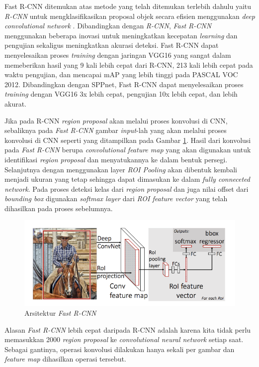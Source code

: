 Fast R-CNN ditemukan atas metode yang telah ditemukan terlebih dahulu yaitu \textit{R-CNN} untuk mengklasifikasikan proposal objek secara efisien menggunakan \textit{deep convolutional network} \citep{fast-rcnn}. Dibandingkan dengan \textit{R-CNN}, \textit{Fast R-CNN} menggunakan beberapa inovasi untuk meningkatkan kecepatan \textit{learning} dan pengujian sekaligus meningkatkan akurasi deteksi. Fast R-CNN dapat menyelesaikan proses \textit{training} dengan jaringan VGG16 yang sangat dalam memeberikan hasil yang 9 kali lebih cepat dari R-CNN, 213 kali lebih cepat pada waktu pengujian, dan mencapai mAP yang lebih tinggi pada PASCAL VOC 2012. Dibandingkan dengan SPPnet, Fast R-CNN dapat menyelesaikan proses \textit{training} dengan VGG16 3x lebih cepat, pengujian 10x lebih cepat, dan lebih akurat.

Jika pada R-CNN \textit{region proposal} akan melalui proses konvolusi di CNN, sebaliknya pada \textit{Fast R-CNN} gambar \textit{input}-lah yang akan melalui proses konvolusi di CNN seperti yang ditampilkan pada Gambar \ref{fig:fast-rcnn}. Hasil dari konvolusi pada \textit{Fast R-CNN} berupa \textit{convolutional feature map} yang akan digunakan untuk identifikasi \textit{region proposal} dan menyatukannya ke dalam bentuk persegi. Selanjutnya dengan menggunakan layer \textit{ROI Pooling} akan dibentuk kembali menjadi ukuran yang tetap sehingga dapat dimasukan ke dalam \textit{fully conneceted network}. Pada proses deteksi kelas dari \textit{region proposal} dan juga nilai offset dari \textit{bounding box} digunakan \textit{softmax layer} dari \textit{ROI feature vector} yang telah dihasilkan pada proses sebelumnya.

\begin{figure}[h]
	\centering
	\includegraphics[scale=0.3]{gambar/fast-rcnn.png}
	\caption{Arsitektur \textit{Fast R-CNN} \citep{arch-fast-rcnn}}
	\label{fig:fast-rcnn}
\end{figure}

Alasan \textit{Fast R-CNN} lebih cepat daripada R-CNN adalah karena kita tidak perlu memasukkan 2000 \textit{region proposal} ke \textit{convolutional neural network} setiap saat. Sebagai gantinya, operasi konvolusi dilakukan hanya sekali per gambar dan \textit{feature map} dihasilkan operasi tersebut.

